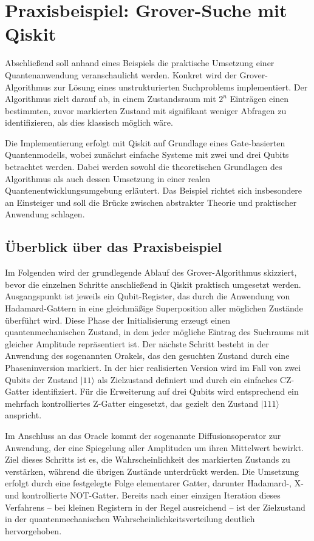 \section{Praxisbeispiel: Grover-Suche mit Qiskit}
\label{sec:practical-example}

Abschließend soll anhand eines Beispiels die praktische Umsetzung einer Quantenanwendung veranschaulicht werden. Konkret wird der Grover-Algorithmus zur Lösung eines unstrukturierten Suchproblems implementiert. Der Algorithmus zielt darauf ab, in einem Zustandsraum mit $2^n$ Einträgen einen bestimmten, zuvor markierten Zustand mit signifikant weniger Abfragen zu identifizieren, als dies klassisch möglich wäre.

Die Implementierung erfolgt mit Qiskit auf Grundlage eines Gate-basierten Quantenmodells, wobei zunächst einfache Systeme mit zwei und drei Qubits betrachtet werden. Dabei werden sowohl die theoretischen Grundlagen des Algorithmus als auch dessen Umsetzung in einer realen Quantenentwicklungsumgebung erläutert. Das Beispiel richtet sich insbesondere an Einsteiger und soll die Brücke zwischen abstrakter Theorie und praktischer Anwendung schlagen.

\subsection{Überblick über das Praxisbeispiel}

Im Folgenden wird der grundlegende Ablauf des Grover-Algorithmus skizziert, bevor die einzelnen Schritte anschließend in Qiskit praktisch umgesetzt werden. Ausgangspunkt ist jeweils ein Qubit-Register, das durch die Anwendung von Hadamard-Gattern in eine gleichmäßige Superposition aller möglichen Zustände überführt wird. Diese Phase der Initialisierung erzeugt einen quantenmechanischen Zustand, in dem jeder mögliche Eintrag des Suchraums mit gleicher Amplitude repräsentiert ist. Der nächste Schritt besteht in der Anwendung des sogenannten Orakels, das den gesuchten Zustand durch eine Phaseninversion markiert. In der hier realisierten Version wird im Fall von zwei Qubits der Zustand $|11\rangle$ als Zielzustand definiert und durch ein einfaches CZ-Gatter identifiziert. Für die Erweiterung auf drei Qubits wird entsprechend ein mehrfach kontrolliertes Z-Gatter eingesetzt, das gezielt den Zustand $|111\rangle$ anspricht.

Im Anschluss an das Oracle kommt der sogenannte Diffusionsoperator zur Anwendung, der eine Spiegelung aller Amplituden um ihren Mittelwert bewirkt. Ziel dieses Schritts ist es, die Wahrscheinlichkeit des markierten Zustands zu verstärken, während die übrigen Zustände unterdrückt werden. Die Umsetzung erfolgt durch eine festgelegte Folge elementarer Gatter, darunter Hadamard-, X- und kontrollierte NOT-Gatter. Bereits nach einer einzigen Iteration dieses Verfahrens – bei kleinen Registern in der Regel ausreichend – ist der Zielzustand in der quantenmechanischen Wahrscheinlichkeitsverteilung deutlich hervorgehoben.

